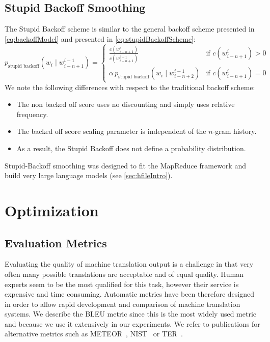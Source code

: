 \subsection{Stupid Backoff Smoothing}
\label{sec:stupidBackoffSmoothing}

The Stupid Backoff scheme is similar to
the general backoff scheme presented in \autoref{eq:backoffModel}
and presented in \autoref{eq:stupidBackoffScheme}:
%
\begin{equation}
  p_{\text{stupid backoff}}(w_i \mid w_{i - n + 1}^{i - 1}) =
  \begin{cases}
    \frac{c(w_{i - n + 1}^i)}{c(w_{i - n + 1}^{i - 1})} & \text{if } c(w_{i - n + 1}^i) > 0 \\
    \alpha \, p_{\text{stupid backoff}}(w_i \mid w_{i - n + 2}^{i - 1}) & \text{if } c(w_{i - n + 1}^i) = 0
  \end{cases}
  \label{eq:stupidBackoffScheme}  
\end{equation}
%
We note the following differences with respect to the traditional backoff
scheme:
%
\begin{itemize}
  \item The non backed off score uses no discounting and simply uses relative frequency.
  \item The backed off score scaling parameter is independent of
    the $n$-gram history.
  \item As a result, the Stupid Backoff does not define a probability distribution.
\end{itemize}
%
Stupid-Backoff smoothing was designed to fit the MapReduce framework
and build very large language models (see \autoref{sec:hfileIntro}).


\section{Optimization}
\label{sec:optimization}

    \subsection{Evaluation Metrics}
    \label{sec:evaluationMetrics}

    Evaluating the quality of machine translation output is a challenge in that very often many possible
    translations are acceptable and of equal quality. Human experts seem to be the most qualified for this task, however
    their service is expensive and time consuming. Automatic metrics have been therefore designed
    in order to allow rapid development and comparison of machine translation systems. We describe
    the BLEU metric since this is the most widely used metric and because we use it extensively in our experiments.
    We refer to publications for alternative metrics such as 
    METEOR~\citep{banerjee-lavie:2005:MTSumm}, NIST~\citep{doddington:2002:HLTR} or
    TER~\citep{snover-dorr-schwartz-micciulla-makhoul:2006:AMTA}.

